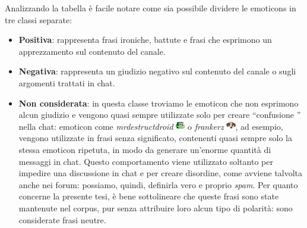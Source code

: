 \documentclass[a4paper,12pt,openright,twoside]{report}
\theoremstyle{definition}
\begin{document}
Analizzando la tabella è facile notare come sia possibile dividere le emoticons in tre classi separate:
\begin{itemize}
\item \textbf{Positiva}: rappresenta frasi ironiche, battute e frasi che esprimono un apprezzamento sul contenuto del canale.
\item \textbf{Negativa}: rappresenta un giudizio negativo sul contenuto del canale o sugli argomenti trattati in chat.
\item \textbf{Non considerata}: in questa classe troviamo le emoticon che non esprimono alcun giudizio 
e vengono quasi sempre utilizzate solo per creare ``confusione '' nella chat:
emoticon come \emph{mrdestructdroid} \includegraphics[height=0.4cm, width=0.4cm]{Immagini/Emoticons/mrdestructoid.png} o \emph{frankerz} \includegraphics[height=0.4cm, width=0.4cm]{Immagini/Emoticons/frankerz.png},
ad esempio, vengono utilizzate in frasi senza significato, contenenti quasi
sempre solo la stessa emoticon ripetuta,
in modo da generare un'enorme quantità di messaggi in chat. 
Questo comportamento viene utilizzato soltanto per impedire 
una discussione in chat e per creare disordine, come avviene talvolta anche nei forum: 
possiamo, quindi, definirla vero e proprio \emph{spam}. 
Per quanto concerne la presente tesi, è bene sottolineare che
queste frasi sono state mantenute nel corpus, pur senza attribuire loro alcun tipo di polarità: sono considerate frasi neutre.
\end{itemize}
\end{document}
